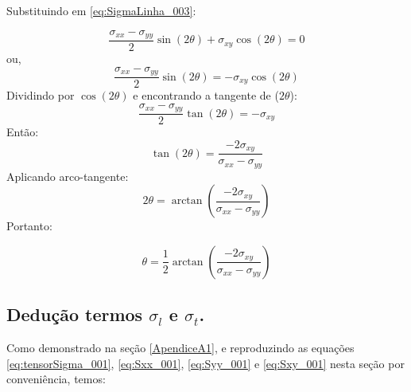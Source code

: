 \documentclass[
12pt,
a4paper,
oneside,
chapter=TITLE,
sumario=tradicional
]{abntex2}
\begin{document}
Substituindo em \ref{eq:SigmaLinha_003}:

\begin{equation} %
\frac{\sigma_{xx}-\sigma_{yy}}{2}\sin(2\theta)  
+  
\sigma_{xy}\cos(2\theta)  
=0  
	\label{eq:SigmaLa_004} 
\end{equation}
ou,
\begin{equation*} 
\frac{\sigma_{xx}-\sigma_{yy}}{2}\sin(2\theta)
=
-\sigma_{xy}\cos(2\theta)  
\end{equation*}
Dividindo por $\cos(2\theta)$ e encontrando a tangente de ($2\theta$):
\begin{equation*}  
\frac{\sigma_{xx}-\sigma_{yy}}{2}\tan(2\theta) =
-\sigma_{xy}  
	\end{equation*}
Então:
\begin{equation*}
\tan(2\theta)
=
\frac{-2\sigma_{xy}}{\sigma_{xx}-\sigma_{yy}}  
\end{equation*}
Aplicando arco-tangente:
\begin{equation*} 
2\theta=  
\arctan\left(  
\frac{-2\sigma_{xy}}  
{\sigma_{xx}-\sigma_{yy}}  
\right)  
\end{equation*}
Portanto:

\begin{tcolorbox}[colback=red!5, colframe=red!40!black, title=\textbf{Ângulo de rotação do material anisotrópico em relação ao eixo de coordenadas global.}]
\begin{equation}
		\theta=  
		\frac{1}{2}  
		\arctan\left(  
		\frac{-2\sigma_{xy}}  
		{\sigma_{xx}-\sigma_{yy}}  
		\right)  
		\label{eq:AngleTheta_001}
\end{equation}
\end{tcolorbox}




\subsection{Dedução termos $\sigma_l$ e $\sigma_t$.}

Como demonstrado na seção \ref{ApendiceA1}, e reproduzindo as equações \ref{eq:tensorSigma_001}, \ref{eq:Sxx_001}, \ref{eq:Syy_001} e \ref{eq:Sxy_001} nesta seção por conveniência, temos: 
\end{document}
